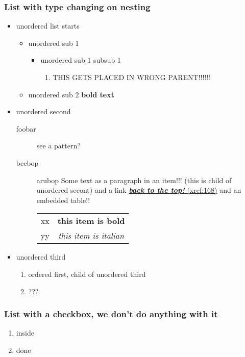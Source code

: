 \documentclass[11pt]{article}
\begin{document}
\subsubsection{List with type changing on nesting  }
 \label{obj-137}
 \label{obj-136}
\begin{itemize}
\item
unordered list starts
\begin{itemize}
\item
unordered sub 1
\begin{itemize}
\item
unordered sub 1 subsub 1
\begin{enumerate}
\item
THIS GETS PLACED IN WRONG PARENT!!!!!!
\end{enumerate}
\end{itemize}
\item
unordered sub 2
\textbf{bold text}
\end{itemize}
\item
unordered second 
\begin{description}
\item[foobar]
see a pattern?
\item[beebop]
arubop
\label{obj-164} 
  Some text as a paragraph in an item!!! (this is child of unordered secont)
and a link
\hyperref[obj-15]{\textbf{\emph{back to the top!}} (xref:168)}
  and an embedded table!!

\begin{tabular}{|c|c|}
\hline
 xx  & \textbf{this item is bold} \\
 yy  & \emph{this item is italian} \\
\hline
\end{tabular}
\end{description}
\item
unordered third
\begin{enumerate}
\item
ordered first, child of unordered third
\item
???
\end{enumerate}
\vspace{\baselineskip}
\vspace{\baselineskip}
\end{itemize}
\vspace{\baselineskip}
\subsubsection{List with a checkbox, we don't do anything with it  }
 \label{obj-195}
 \label{obj-194}
\begin{enumerate}
\item
inside
\item
done
\vspace{\baselineskip}
\vspace{\baselineskip}
\end{enumerate}
\end{document}
